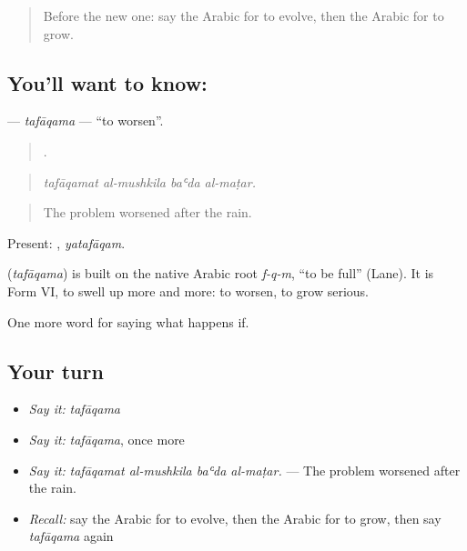 \label{lesson:AR-C413-tafaqama}



\begin{quote}
Before the new one: say the Arabic for to evolve, then the Arabic for to grow.
\end{quote}

\subsection*{You'll want to know: }
\textbf{} — \emph{tafāqama} — \textquotedblleft{}to worsen\textquotedblright{}.

\begin{quote}
   .
\end{quote}

\begin{quote}
\emph{tafāqamat al-mushkila baʿda al-maṭar.}
\end{quote}

\begin{quote}
The problem worsened after the rain.
\end{quote}

Present: , \emph{yatafāqam}.

\begin{cousinweb}
\textbf{} (\emph{tafāqama}) is built on the native Arabic root \emph{f-q-m}, \textquotedblleft{}to be full\textquotedblright{} (Lane). It is Form VI, to swell up more and more: to worsen, to grow serious.
\end{cousinweb}

\begin{grammarlens}[title={What you've built}]
One more word for saying what happens if.
\end{grammarlens}

\subsection*{Your turn}
\begin{itemize}
\raggedright
  \item \emph{Say it:} \emph{tafāqama}
  \item \emph{Say it:} \emph{tafāqama}, once more
  \item \emph{Say it:} \emph{tafāqamat al-mushkila baʿda al-maṭar.} — The problem worsened after the rain.
  \item \emph{Recall:} say the Arabic for to evolve, then the Arabic for to grow, then say \emph{tafāqama} again
\end{itemize}

